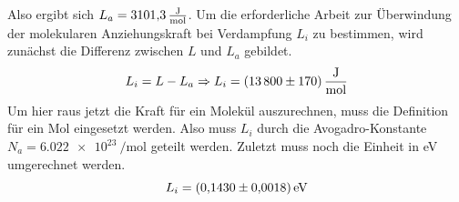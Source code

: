 Also ergibt sich $L_a = \SI{3101.3}{\frac{\J}{\mol}}$.
Um die erforderliche Arbeit zur Überwindung der molekularen Anziehungskraft bei Verdampfung $L_i$ zu bestimmen, wird
zunächst die Differenz zwischen $L$ und $L_a$ gebildet.
\begin{equation}
    L_i = L - L_a \Rightarrow L_i = \SI{13800 \pm 170}{\frac{\J}{\mol}}
\end{equation}
Um hier raus jetzt die Kraft für ein Molekül auszurechnen, muss die Definition für ein Mol eingesetzt werden.
Also muss $L_i$ durch die Avogadro-Konstante $N_a = \SI{6.022e23}{\per\mol}$ \cite{Avogadro} geteilt werden.
Zuletzt muss noch die Einheit in eV umgerechnet werden.
\begin{equation*}
  L_i = \SI{0.1430 \pm 0.0018 }{eV}
\end{equation*}

